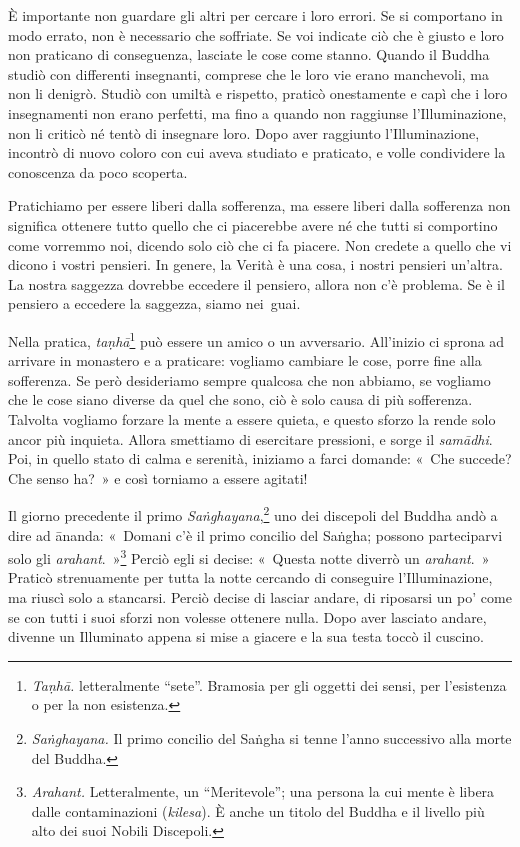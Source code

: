 È importante non guardare gli altri per cercare i loro errori. Se si
comportano in modo errato, non è necessario che soffriate. Se voi
indicate ciò che è giusto e loro non praticano di conseguenza, lasciate
le cose come stanno. Quando il Buddha studiò con differenti insegnanti,
comprese che le loro vie erano manchevoli, ma non li denigrò. Studiò con
umiltà e rispetto, praticò onestamente e capì che i loro insegnamenti
non erano perfetti, ma fino a quando non raggiunse l'Illuminazione, non
li criticò né tentò di insegnare loro. Dopo aver raggiunto
l'Illuminazione, incontrò di nuovo coloro con cui aveva studiato e
praticato, e volle condividere la conoscenza da poco scoperta.

Pratichiamo per essere liberi dalla sofferenza, ma essere liberi dalla
sofferenza non significa ottenere tutto quello che ci piacerebbe avere
né che tutti si comportino come vorremmo noi, dicendo solo ciò che ci fa
piacere. Non credete a quello che vi dicono i vostri pensieri. In
genere, la Verità è una cosa, i nostri pensieri un'altra. La nostra
saggezza dovrebbe eccedere il pensiero, allora non c'è problema. Se è il
pensiero a eccedere la saggezza, siamo nei~guai.

Nella pratica, \emph{taṇhā}\footnote{\emph{Taṇhā.} letteralmente
  ``sete''. Bramosia per gli oggetti dei sensi, per l'esistenza o per la
  non esistenza.} può essere un amico o un avversario. All'inizio ci
sprona ad arrivare in monastero e a praticare: vogliamo cambiare le
cose, porre fine alla sofferenza. Se però desideriamo sempre qualcosa
che non abbiamo, se vogliamo che le cose siano diverse da quel che sono,
ciò è solo causa di più sofferenza. Talvolta vogliamo forzare la mente a
essere quieta, e questo sforzo la rende solo ancor più inquieta. Allora
smettiamo di esercitare pressioni, e sorge il \emph{samādhi}. Poi, in
quello stato di calma e serenità, iniziamo a farci domande: «~Che
succede? Che senso ha?~» e così torniamo a essere agitati!

Il giorno precedente il primo \emph{Saṅghayana},\footnote{\emph{Saṅghayana.} Il
  primo concilio del Saṅgha si tenne l'anno successivo alla morte del
  Buddha.} uno dei discepoli del Buddha andò a dire ad ānanda: «~Domani
c'è il primo concilio del Saṅgha; possono parteciparvi solo gli
\emph{arahant}.~»\footnote{\emph{Arahant.} Letteralmente, un
  ``Meritevole''; una persona la cui mente è libera dalle contaminazioni
  (\emph{kilesa}). È anche un titolo del Buddha e il livello più alto
  dei suoi Nobili Discepoli.} Perciò egli si decise: «~Questa notte
diverrò un \emph{arahant}.~» Praticò strenuamente per tutta la notte
cercando di conseguire l'Illuminazione, ma riuscì solo a stancarsi.
Perciò decise di lasciar andare, di riposarsi un po' come se con tutti i
suoi sforzi non volesse ottenere nulla. Dopo aver lasciato andare,
divenne un Illuminato appena si mise a giacere e la sua testa toccò il
cuscino.

